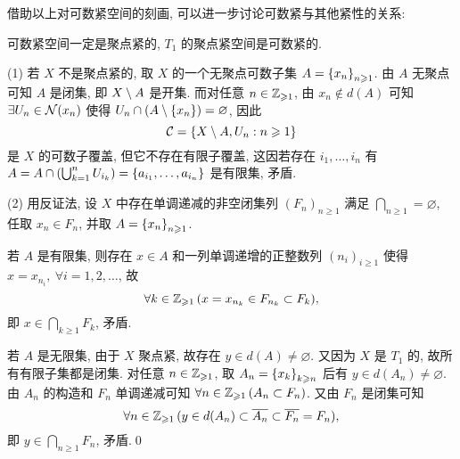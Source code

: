     借助以上对可数紧空间的刻画, 可以进一步讨论可数紧与其他紧性的关系:

    \begin{Proposition}
        可数紧空间一定是聚点紧的, $ T_1 $ 的聚点紧空间是可数紧的.
    \end{Proposition}
    \begin{Proof}
        (1) 若 $ X $ 不是聚点紧的, 取 $ X $ 的一个无聚点可数子集 $ A=\left\{ x_n \right\}_{n\geqslant 1} $. 由 $ A $ 无聚点可知 $ A $ 是闭集, 即 $ X\setminus A $ 是开集. 而对任意 $ n\in\mathbb{Z}_{\geqslant 1} $, 由 $ x_n\notin d(A) $ 可知 $ \exists U_n\in\mathcal{N}(x_n) $ 使得 $ U_n\cap(A\setminus\left\{ x_n \right\})=\varnothing $, 因此
        \[
            \mathcal{C}=\left\{ X\setminus A, U_n : n\geqslant 1 \right\}
        \]
        是 $ X $ 的可数子覆盖, 但它不存在有限子覆盖, 这因若存在 $ i_1,\dots,i_n $ 有 $ A=A\cap\left(\bigcup_{k=1}^nU_{i_k}\right)=\left\{ a_{i_1},\dots,a_{i_n} \right\} $ 是有限集, 矛盾.

        (2) 用反证法, 设 $ X $ 中存在单调递减的非空闭集列 $ (F_n)_{n\geqslant 1} $ 满足 $ \bigcap_{n\geqslant 1}=\varnothing $, 任取 $ x_n\in F_n $, 并取 $ A=\left\{ x_n \right\}_{n\geqslant 1} $.

        若 $ A $ 是有限集, 则存在 $ x\in A $ 和一列单调递增的正整数列 $ (n_i)_{i\geqslant 1} $ 使得 $ x=x_{n_i},\ \forall i=1,2,\dots $, 故
        \[
            \forall k\in\mathbb{Z}_{\geqslant 1}\,(x=x_{n_k}\in F_{n_k}\subset F_k),
        \]
        即 $ x\in\bigcap_{k\geqslant 1}F_k $, 矛盾.

        若 $ A $ 是无限集, 由于 $ X $ 聚点紧, 故存在 $ y\in d(A)\ne\varnothing $. 又因为 $ X $ 是 $ T_1 $ 的, 故所有有限子集都是闭集. 对任意 $ n\in\mathbb{Z}_{\geqslant 1} $, 取 $ A_n=\left\{ x_k \right\}_{k\geqslant n} $ 后有 $ y\in d(A_n)\ne\varnothing $. 由 $ A_n $ 的构造和 $ F_n $ 单调递减可知 $ \forall n\in\mathbb{Z}_{\geqslant 1}\,(A_n\subset F_n) $. 又由 $ F_n $ 是闭集可知
        \[
            \forall n\in\mathbb{Z}_{\geqslant 1}\,(y\in d(A_n)\subset\overline{A_n}\subset\overline{F_n}=F_n),
        \]
        即 $ y\in\bigcap_{n\geqslant 1}F_n $, 矛盾.\qed
    \end{Proof}

